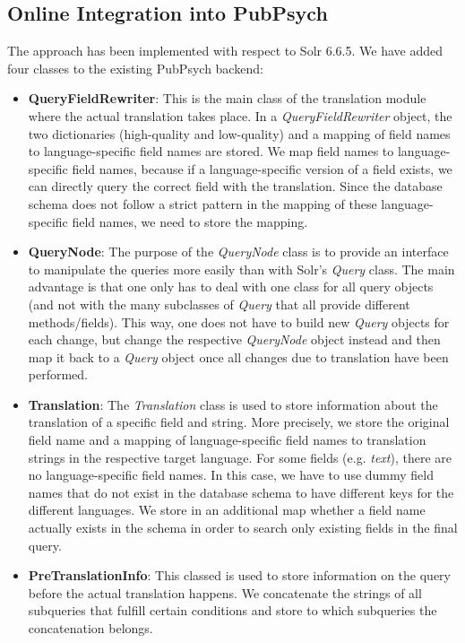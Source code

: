 \documentclass[a4paper,11pt]{article}
\begin{document}
	\subsection{Online Integration into PubPsych}
	\label{ss:integration}
	The approach has been implemented with respect to Solr 6.6.5. We have added four classes to the existing PubPsych backend:
	\begin{itemize}
		\item \textbf{QueryFieldRewriter}: This is the main class of the translation module where the actual translation takes place. In a \textit{QueryFieldRewriter} object, the two dictionaries (high-quality and low-quality) and a mapping of field names to language-specific field names are stored. We map field names to language-specific field names, because if a language-specific version of a field exists, we can directly query the correct field with the translation. Since the database schema does not follow a strict pattern in the mapping of these language-specific field names, we need to store the mapping.
		\item \textbf{QueryNode}: The purpose of the \textit{QueryNode} class is to provide an interface to manipulate the queries more easily than with Solr’s \textit{Query} class. The main advantage is that one only has to deal with one class for all query objects (and not with the many subclasses of \textit{Query} that all provide different methods/fields). This way, one does not have to build new \textit{Query} objects for each change, but change the respective \textit{QueryNode} object instead and then map it back to a \textit{Query} object once all changes due to translation have been performed.
		\item \textbf{Translation}: The \textit{Translation} class is used to store information about the translation of a specific field and string. More precisely, we store the original field name and a mapping of language-specific field names to translation strings in the respective target language. For some fields (e.g. \textit{text}), there are no language-specific field names. In this case, we have to use dummy field names that do not exist in the database schema to have different keys for the different languages. We store in an additional map whether a field name actually exists in the schema in order to search only existing fields in the final query.
		\item \textbf{PreTranslationInfo}: This classed is used to store information on the query before the actual translation happens. We concatenate the strings of all subqueries that fulfill certain conditions and store to which subqueries the concatenation belongs. 
	\end{itemize}
\end{document}
